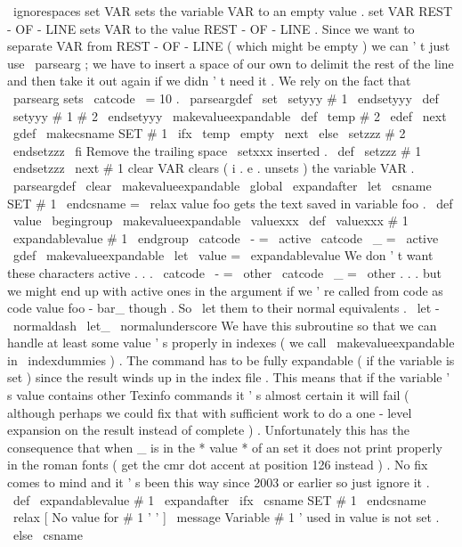 {{{{{{\
ignorespaces
}
%
}
%
set
VAR
sets
the
variable
VAR
to
an
empty
value
.
%
set
VAR
REST
-
OF
-
LINE
sets
VAR
to
the
value
REST
-
OF
-
LINE
.
%
%
Since
we
want
to
separate
VAR
from
REST
-
OF
-
LINE
(
which
might
be
%
empty
)
we
can
'
t
just
use
\
parsearg
;
we
have
to
insert
a
space
of
our
%
own
to
delimit
the
rest
of
the
line
and
then
take
it
out
again
if
we
%
didn
'
t
need
it
.
%
We
rely
on
the
fact
that
\
parsearg
sets
\
catcode
\
=
10
.
%
\
parseargdef
\
set
{
\
setyyy
#
1
\
endsetyyy
}
\
def
\
setyyy
#
1
#
2
\
endsetyyy
{
%
{
%
\
makevalueexpandable
\
def
\
temp
{
#
2
}
%
\
edef
\
next
{
\
gdef
\
makecsname
{
SET
#
1
}
}
%
\
ifx
\
temp
\
empty
\
next
{
}
%
\
else
\
setzzz
#
2
\
endsetzzz
\
fi
}
%
}
%
Remove
the
trailing
space
\
setxxx
inserted
.
\
def
\
setzzz
#
1
\
endsetzzz
{
\
next
{
#
1
}
}
%
clear
VAR
clears
(
i
.
e
.
unsets
)
the
variable
VAR
.
%
\
parseargdef
\
clear
{
%
{
%
\
makevalueexpandable
\
global
\
expandafter
\
let
\
csname
SET
#
1
\
endcsname
=
\
relax
}
%
}
%
value
{
foo
}
gets
the
text
saved
in
variable
foo
.
\
def
\
value
{
\
begingroup
\
makevalueexpandable
\
valuexxx
}
\
def
\
valuexxx
#
1
{
\
expandablevalue
{
#
1
}
\
endgroup
}
{
\
catcode
\
-
=
\
active
\
catcode
\
_
=
\
active
%
\
gdef
\
makevalueexpandable
{
%
\
let
\
value
=
\
expandablevalue
%
We
don
'
t
want
these
characters
active
.
.
.
\
catcode
\
-
=
\
other
\
catcode
\
_
=
\
other
%
.
.
.
but
we
might
end
up
with
active
ones
in
the
argument
if
%
we
'
re
called
from
code
as
code
{
value
{
foo
-
bar_
}
}
though
.
%
So
\
let
them
to
their
normal
equivalents
.
\
let
-
\
normaldash
\
let_
\
normalunderscore
}
}
%
We
have
this
subroutine
so
that
we
can
handle
at
least
some
value
'
s
%
properly
in
indexes
(
we
call
\
makevalueexpandable
in
\
indexdummies
)
.
%
The
command
has
to
be
fully
expandable
(
if
the
variable
is
set
)
since
%
the
result
winds
up
in
the
index
file
.
This
means
that
if
the
%
variable
'
s
value
contains
other
Texinfo
commands
it
'
s
almost
certain
%
it
will
fail
(
although
perhaps
we
could
fix
that
with
sufficient
work
%
to
do
a
one
-
level
expansion
on
the
result
instead
of
complete
)
.
%
%
Unfortunately
this
has
the
consequence
that
when
_
is
in
the
*
value
*
%
of
an
set
it
does
not
print
properly
in
the
roman
fonts
(
get
the
cmr
%
dot
accent
at
position
126
instead
)
.
No
fix
comes
to
mind
and
it
'
s
%
been
this
way
since
2003
or
earlier
so
just
ignore
it
.
%
\
def
\
expandablevalue
#
1
{
%
\
expandafter
\
ifx
\
csname
SET
#
1
\
endcsname
\
relax
{
[
No
value
for
#
1
'
'
]
}
%
\
message
{
Variable
#
1
'
used
in
value
is
not
set
.
}
%
\
else
\
csname
}}}}}
